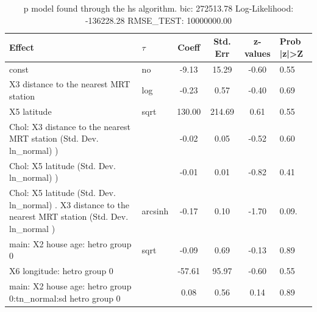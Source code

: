 \begin{table}
	\caption{p model found through the hs algorithm. bic: 272513.78 Log-Likelihood: -136228.28 RMSE_TEST: 10000000.00}
	\begin{center}
		\begin{tabular}{|l|l|c|c|c|l|}
			\hline
			Effect & $\tau$ & Coeff & Std. Err & z-values & Prob |z|>Z \\
			\hline
			const & no & -9.13 & 15.29 & -0.60 & 0.55 \\
			\hline
			X3 distance to the nearest MRT station & log & -0.23 & 0.57 & -0.40 & 0.69 \\
			\hline
			X5 latitude & sqrt & 130.00 & 214.69 & 0.61 & 0.55 \\
			\hline
			 Chol: X3 distance to the nearest MRT station (Std. Dev. ln_normal) ) &  & -0.02 & 0.05 & -0.52 & 0.60 \\
			\hline
			 Chol: X5 latitude (Std. Dev. ln_normal) ) &  & -0.01 & 0.01 & -0.82 & 0.41 \\
			\hline
			 Chol: X5 latitude (Std. Dev. ln_normal) . X3 distance to the nearest MRT station (Std. Dev.   ln_normal ) & arcsinh & -0.17 & 0.10 & -1.70 & 0.09. \\
			\hline
			main: X2 house age: hetro group 0 & sqrt & -0.09 & 0.69 & -0.13 & 0.89 \\
			\hline
			X6 longitude: hetro group 0 &  & -57.61 & 95.97 & -0.60 & 0.55 \\
			\hline
			main: X2 house age: hetro group 0:tn_normal:sd  hetro group 0 &  & 0.08 & 0.56 & 0.14 & 0.89 \\
			\hline
		\end{tabular}
	\end{center}
\end{table}
